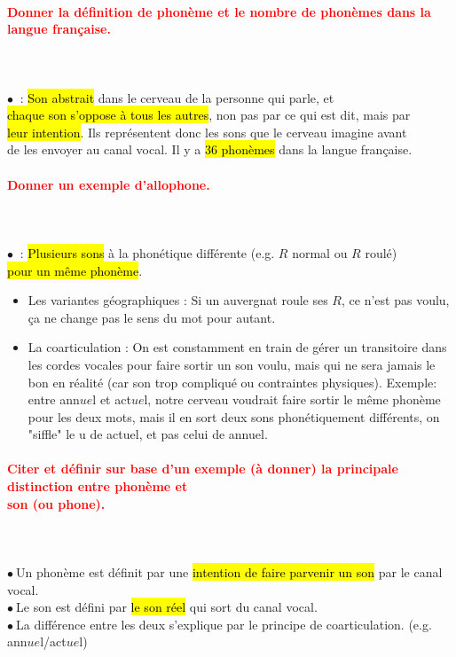 \documentclass[letterpaper, 12pt]{article}
\newcommand{\alinea}{
\hspace*{0.3cm}}
\newcommand{\red}[1]{
	\textcolor{red}{#1}
}
\newcommand{\myul}[1]{
	\underline{\smash{#1}}
}
\newcommand{\point}{$\bullet\ $}
\begin{document}
		\paragraph{\red{Donner la définition de phonème et le nombre de phonèmes dans la langue française.}}~\\~\\
			\point \myul{Phon\`eme} : \hl{Son abstrait} dans le cerveau de la personne qui parle, et 
				\\\alinea \hl{chaque son s'oppose \`a tous les autres}, non pas par ce qui est dit, mais par
				\\\alinea \hl{leur intention}. Ils représentent donc les sons que le cerveau imagine avant
				\\\alinea de les envoyer au canal vocal. Il y a \hl{36 phon\`emes} dans la langue française.
		
		\paragraph{\red{Donner un exemple d'allophone.}}~\\~\\
			\point \myul{Allophone} : \hl{Plusieurs sons} à la phonétique différente (e.g. $R$ normal ou $R$ roulé)
				\\\alinea \hl{pour un m\^eme phon\`eme}.
			\begin{itemize}
				\setlength{\itemsep}{0pt}		
				\setlength{\parskip}{0pt}		
				\setlength{\parsep}{0pt}	
				\item Les variantes géographiques : Si un auvergnat roule ses $R$, ce n'est pas voulu,
					ça ne change pas le sens du mot pour autant.
				\item La coarticulation : On est constamment en train de gérer un transitoire dans les cordes
					vocales pour faire sortir un son voulu, mais qui ne sera jamais le bon en réalité
					(car son trop compliqué ou contraintes physiques). Exemple: entre ann$ue$l et act$ue$l,
					notre cerveau voudrait faire sortir le même phonème pour les deux mots, mais il en sort
					deux sons phonétiquement différents, on "siffle" le u de actuel, et pas celui de annuel.
			\end{itemize}
		
		\paragraph{\red{Citer et définir sur base d'un exemple (à donner) la principale distinction entre phonème et 
		~\\ \hspace*{0.035cm} son (ou phone).}}~\\~\\
			\point Un phon\`eme est définit par une \hl{intention de faire parvenir un son} par le canal vocal.\\
			\point Le son est défini par \hl{le son r\'eel} qui sort du canal vocal.\\
			\point La différence entre les deux s'explique par le principe de coarticulation. (e.g. ann$ue$l/act$ue$l)
		
\end{document}
